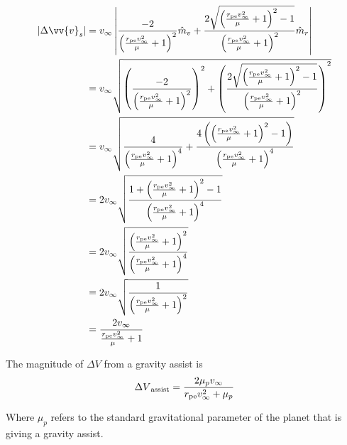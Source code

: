 \documentclass[../basicOrbitalDynamics.tex]{subfiles}
\begin{document}
\begin{align*}
    |\Delta\vv{v}_s| & = v_\infty\left|\frac{-2}{\left(\frac{\st{r}{pe}v_\infty^2}{\mu}+1\right)^2}\hat{m}_v+\frac{2\sqrt{\left(\frac{\st{r}{pe}v_\infty^2}{\mu}+1\right)^2-1}}{\left(\frac{\st{r}{pe}v_\infty^2}{\mu}+1\right)^2}\hat{m}_r\right|       \\
                     & = v_\infty\sqrt{\left(\frac{-2}{\left(\frac{\st{r}{pe}v_\infty^2}{\mu}+1\right)^2}\right)^2+\left(\frac{2\sqrt{\left(\frac{\st{r}{pe}v_\infty^2}{\mu}+1\right)^2-1}}{\left(\frac{\st{r}{pe}v_\infty^2}{\mu}+1\right)^2}\right)^2} \\
                     & = v_\infty\sqrt{\frac{4}{\left(\frac{\st{r}{pe}v_\infty^2}{\mu}+1\right)^4}+\frac{4\left(\left(\frac{\st{r}{pe}v_\infty^2}{\mu}+1\right)^2-1\right)}{\left(\frac{\st{r}{pe}v_\infty^2}{\mu}+1\right)^4}}                          \\
                     & = 2v_\infty\sqrt{\frac{1+\left(\frac{\st{r}{pe}v_\infty^2}{\mu}+1\right)^2-1}{\left(\frac{\st{r}{pe}v_\infty^2}{\mu}+1\right)^4}}                                                                                                  \\
                     & = 2v_\infty\sqrt{\frac{\left(\frac{\st{r}{pe}v_\infty^2}{\mu}+1\right)^2}{\left(\frac{\st{r}{pe}v_\infty^2}{\mu}+1\right)^4}}                                                                                                      \\
                     & = 2v_\infty\sqrt{\frac{1}{\left(\frac{\st{r}{pe}v_\infty^2}{\mu}+1\right)^2}}                                                                                                                                                       \\
                     & = \frac{2v_\infty}{\frac{\st{r}{pe}v_\infty^2}{\mu}+1}                                                                                                                                                                              \\
\end{align*}

The magnitude of $\Delta V$ from a gravity assist is
\begin{equation}\label{Gravity Assist Delta V}
    {\Delta V}_\text{assist}=\frac{2\mu_p v_\infty}{{r}_\text{pe}v_\infty^2+\mu_p}\\
\end{equation}

Where $\mu_p$ refers to the standard gravitational parameter of the planet that is giving a gravity assist.
\end{document}
